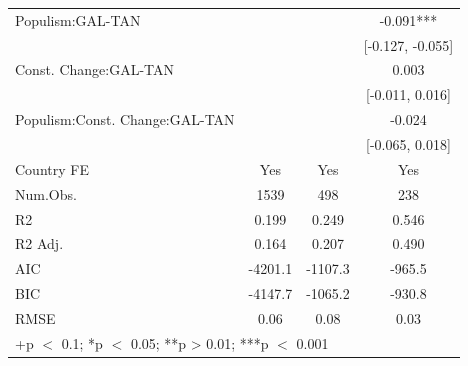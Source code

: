 \documentclass[
  abstract]{article}
\begin{document}
\begin{table}
\begin{tabular}[t]{lccc}
Populism:GAL-TAN &  &  & -0.091***\\
 &  &  & {}[-0.127, -0.055]\\
Const. Change:GAL-TAN &  &  & 0.003\\
 &  &  & {}[-0.011, 0.016]\\
Populism:Const. Change:GAL-TAN &  &  & -0.024\\
 &  &  & {}[-0.065, 0.018]\\
\midrule
Country FE & Yes & Yes & Yes\\
Num.Obs. & 1539 & 498 & 238\\
R2 & 0.199 & 0.249 & 0.546\\
R2 Adj. & 0.164 & 0.207 & 0.490\\
AIC & -4201.1 & -1107.3 & -965.5\\
BIC & -4147.7 & -1065.2 & -930.8\\
RMSE & 0.06 & 0.08 & 0.03\\
\bottomrule
\multicolumn{4}{l}{\rule{0pt}{1em}+p $<$ 0.1; *p $<$ 0.05; **p > 0.01; ***p $<$ 0.001}\\
\end{tabular}
\end{table}
\end{document}

